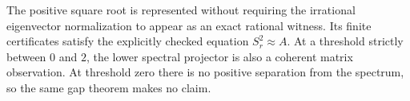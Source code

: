 The positive square root is represented without requiring the irrational eigenvector normalization to appear as an exact rational witness. Its finite certificates satisfy the explicitly checked equation $S_r^2\approx A$. At a threshold strictly between $0$ and $2$, the lower spectral projector is also a coherent matrix observation. At threshold zero there is no positive separation from the spectrum, so the same gap theorem makes no claim.
